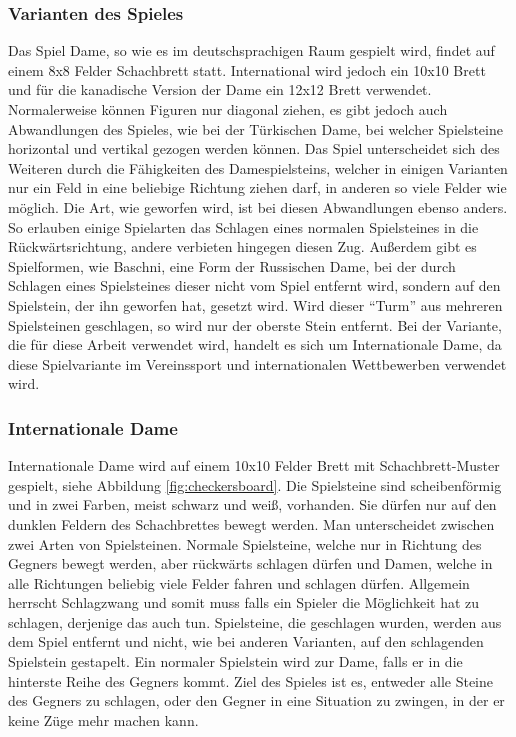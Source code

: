 \documentclass[12pt,a4paper,bibliography=totocnumbered,listof=totocnumbered]{article}
\begin{document}
\subsubsection{Varianten des Spieles}
Das Spiel Dame, so wie es im deutschsprachigen Raum gespielt wird, findet auf einem 8x8 Felder Schachbrett statt. 
International wird jedoch ein 10x10 Brett und für die kanadische Version der Dame ein 12x12 Brett verwendet. 
Normalerweise können Figuren nur diagonal ziehen, es gibt jedoch
auch Abwandlungen des Spieles, wie bei der Türkischen Dame, bei welcher Spielsteine horizontal und vertikal gezogen werden können.
Das Spiel unterscheidet sich des Weiteren durch die Fähigkeiten
des Damespielsteins, welcher in einigen Varianten nur ein Feld in eine beliebige Richtung ziehen darf, in anderen 
so viele Felder wie möglich. Die Art, wie geworfen wird, ist bei diesen Abwandlungen ebenso anders. So erlauben
einige Spielarten das Schlagen eines normalen Spielsteines in die Rückwärtsrichtung, andere verbieten 
hingegen diesen Zug. Außerdem gibt es Spielformen, wie Baschni, eine Form der Russischen Dame, bei der durch Schlagen 
eines Spielsteines dieser nicht vom Spiel entfernt wird, sondern auf den Spielstein, der ihn geworfen hat, gesetzt wird. 
Wird dieser ``Turm'' aus mehreren Spielsteinen geschlagen, so wird nur der oberste Stein entfernt. 
Bei der Variante, die für diese Arbeit verwendet wird, handelt es sich um Internationale Dame, da diese 
Spielvariante im Vereinssport und internationalen Wettbewerben verwendet wird. \cite{DraughtsHistory}

\subsubsection{Internationale Dame}
Internationale Dame wird auf einem 10x10 Felder Brett mit Schachbrett-Muster gespielt,
siehe Abbildung \ref{fig:checkersboard}. Die Spielsteine
sind scheibenförmig und in zwei Farben, meist schwarz und weiß, vorhanden. Sie dürfen nur auf den dunklen
Feldern des Schachbrettes bewegt werden. Man unterscheidet zwischen zwei Arten von Spielsteinen. Normale Spielsteine, welche
nur in Richtung des Gegners bewegt werden, aber rückwärts schlagen dürfen und Damen, welche
in alle Richtungen beliebig viele Felder fahren und schlagen dürfen. Allgemein herrscht Schlagzwang
und somit muss falls ein Spieler die Möglichkeit hat zu schlagen, derjenige das auch tun.
Spielsteine, die geschlagen wurden, werden aus dem Spiel entfernt und nicht, wie bei anderen Varianten, 
auf den schlagenden Spielstein gestapelt.
Ein normaler Spielstein wird zur Dame, falls er in die hinterste Reihe des Gegners kommt.
Ziel des Spieles ist es, entweder alle Steine des Gegners zu schlagen, oder den Gegner in eine Situation
zu zwingen, in der er keine Züge mehr machen kann. \cite{InternationalCheckersRules}
\end{document}
